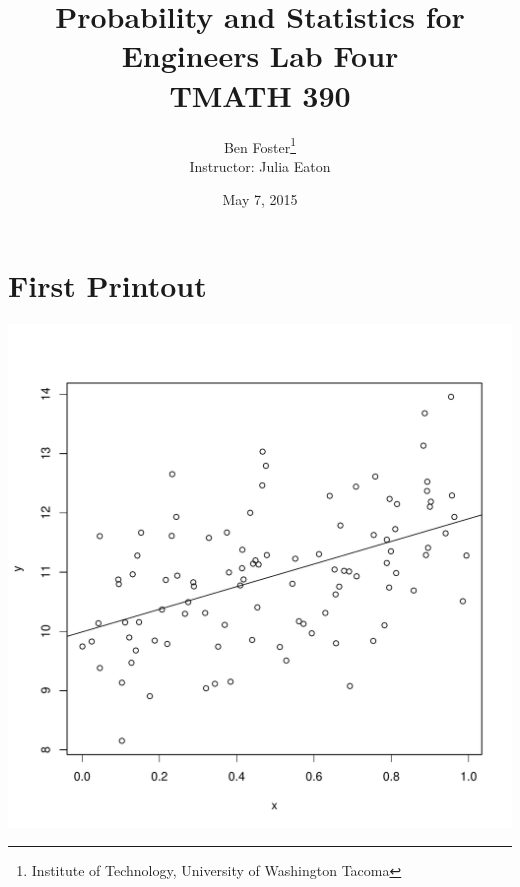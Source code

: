 \documentclass{article}
\begin{document}
{ %
	\title{Probability and Statistics for Engineers Lab Four \\ TMATH 390}
	\author{Ben Foster\thanks{
		Institute of Technology, University of Washington Tacoma} \\
		Instructor: Julia Eaton}
	\date{May 7, 2015}
	\maketitle
	\thispagestyle{empty} %
	\clearpage
	
	\tableofcontents
	\clearpage
	\setcounter{page}{1}
}

\section*{First Printout}

\begin{center}
   \includegraphics[width=\textwidth]{img/Lab4_print_1.pdf} 
\end{center}
\end{document}
